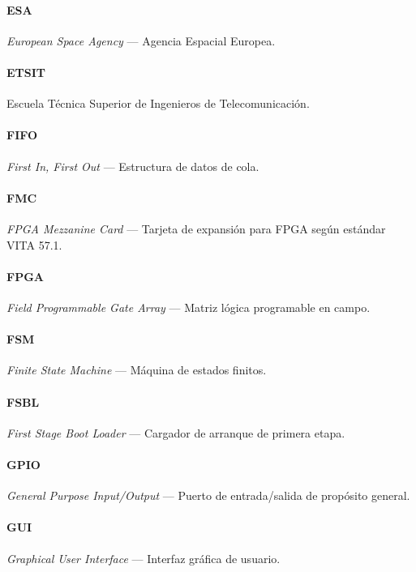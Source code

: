 \paragraph{ESA} \textit{European Space Agency} --- Agencia Espacial Europea.

\paragraph{ETSIT} Escuela Técnica Superior de Ingenieros de Telecomunicación.

\paragraph{FIFO} \textit{First In, First Out} --- Estructura de datos de cola.

\paragraph{FMC} \textit{FPGA Mezzanine Card} --- Tarjeta de expansión para FPGA según estándar VITA 57.1.

\paragraph{FPGA} \textit{Field Programmable Gate Array} --- Matriz lógica programable en campo.

\paragraph{FSM} \textit{Finite State Machine} --- Máquina de estados finitos.

\paragraph{FSBL} \textit{First Stage Boot Loader} --- Cargador de arranque de primera etapa.

\paragraph{GPIO} \textit{General Purpose Input/Output} --- Puerto de entrada/salida de propósito general.

\paragraph{GUI} \textit{Graphical User Interface} --- Interfaz gráfica de usuario.

